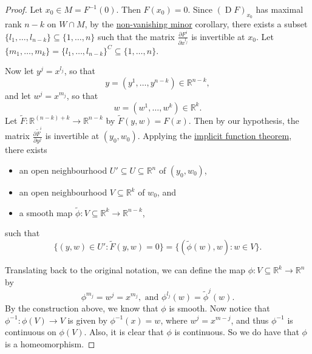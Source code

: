 \documentclass[notoc,notitlepage]{tufte-book}
\DeclareMathOperator{\D}{D}
\begin{document}
\begin{proof}
  Let $x_0 \in M = F^{-1}(0)$. Then $F(x_0) = 0$. Since $(\D F)_{x_0}$ has
  maximal rank $n - k$ on $W \cap M$, by the
  \hyperref[crly:nonvanishing_minor]{non-vanishing minor} corollary, there
  exists a subset $\{ l_1, \ldots, l_{n - k} \} \subseteq \{ 1, \ldots, n \}$
  such that the matrix $\frac{\partial F^i}{\partial x^{l_j}}$ is invertible at
  $x_0$. Let $\{ m_1, \ldots, m_k \} = \{ l_1, \ldots, l_{n - k} \}^C \subseteq
  \{ 1, \ldots, n \}$.

  Now let $y^j = x^{l_j}$, so that
  \begin{equation*}
    y = (y^1, \ldots, y^{n - k}) \in \mathbb{R}^{n - k},
  \end{equation*}
  and let $w^j = x^{m_j}$, so that
  \begin{equation*}
    w = (w^1, \ldots, w^k) \in \mathbb{R}^k.
  \end{equation*}
  Let $\tilde{F} : \mathbb{R}^{(n - k) + k} \to \mathbb{R}^{n - k}$ by
  $\tilde{F}(y, w) = F(x)$. Then by our hypothesis, the matrix $\frac{\partial
  \tilde{F}^i}{\partial y^j}$ is invertible at $(y_0, w_0)$. Applying the
  \hyperref[thm:implicit_function_theorem]{implicit function theorem}, there
  exists
  \begin{itemize}
    \item an open neighbourhood $U' \subseteq U \subseteq \mathbb{R}^n$ of $(y_0,
      w_0)$,
    \item an open neighbourhood $V \subseteq \mathbb{R}^k$ of $w_0$, and
    \item a smooth map $\tilde{\phi} : V \subseteq \mathbb{R}^k \to
      \mathbb{R}^{n - k}$,
  \end{itemize}
  such that
  \begin{equation*}
    \{ (y, w) \in U' : \tilde{F}(y, w) = 0 \} = \{ (\tilde{\phi}(w), w) : w \in
    V \}.
  \end{equation*}

  Translating back to the original notation, we can define the map $\phi : V
  \subseteq \mathbb{R}^k \to \mathbb{R}^n$ by
  \begin{equation*}
    \phi^{m_j} = w^j = x^{m_j}, \text{ and } \phi^{l_j} (w) = \tilde{\phi}^j
    (w).
  \end{equation*}
  By the construction above, we know that $\phi$ is smooth. Now notice that
  $\phi^{-1} : \phi(V) \to V$ is given by $\phi^{-1}(x) = w$, where $w^j =
  x^{m-j}$, and thus $\phi^{-1}$ is continuous on $\phi(V)$. Also, it is clear
  that $\phi$ is continuous. So we do have that $\phi$ is a homeomorphism.


\end{proof}
\end{document}
